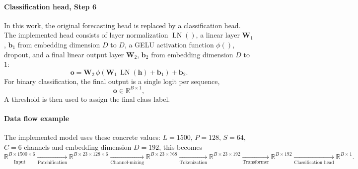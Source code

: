 \paragraph{Classification head,  Step 6}
In this work, the original forecasting head is replaced by a classification head. The implemented head consists of layer normalization $\operatorname{LN}()$, a linear layer $\mathbf{W}_1$, $\mathbf{b}_1$ from embedding dimension $D$ to $D$, a GELU activation function $\phi()$, dropout, and a final linear output layer $\mathbf{W}_2$, $\mathbf{b}_2$ from embedding dimension $D$ to $1$:
\begin{equation}
\mathbf{o}
=
\mathbf{W}_2\,
\phi\!\left(
\mathbf{W}_1\,\operatorname{LN}(\mathbf{h})+\mathbf{b}_1
\right)
+\mathbf{b}_2.
\end{equation}
For binary classification, the final output is a single logit per sequence,
\begin{equation}
\mathbf{o} \in \mathbb{R}^{B \times 1},
\end{equation}
A threshold is then used to assign the final class label.

\paragraph{Data flow example}
The implemented model uses these concrete values: $L=1500$, $P=128$, $S=64$, $C=6$ channels and embedding dimension $D=192$, this becomes
\begin{equation}
\underset{\text{Input}}{\mathbb{R}^{B \times 1500 \times 6}}
\underset{\text{Patchification}}{\;\rightarrow\;}
\mathbb{R}^{B \times 23 \times 128 \times 6}
\underset{\text{Channel-mixing}}{\;\rightarrow\;}
\mathbb{R}^{B \times 23 \times 768}
\underset{\text{Tokenization}}{\;\rightarrow\;}
\mathbb{R}^{B \times 23 \times 192}
\underset{\text{Transformer}}{\;\rightarrow\;}
\mathbb{R}^{B \times 192}
\underset{\text{Classification head}}{\;\rightarrow\;}
\mathbb{R}^{B \times 1}.
\end{equation}

